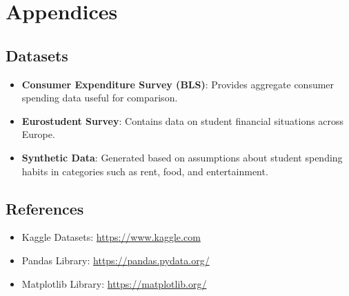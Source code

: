\documentclass{article}
\begin{document}
\section{Appendices}
\subsection{Datasets}
\begin{itemize}
    \item \textbf{Consumer Expenditure Survey (BLS)}: Provides aggregate consumer spending data useful for comparison.
    \item \textbf{Eurostudent Survey}: Contains data on student financial situations across Europe.
    \item \textbf{Synthetic Data}: Generated based on assumptions about student spending habits in categories such as rent, food, and entertainment.
\end{itemize}

\subsection{References}
\begin{itemize}
    \item Kaggle Datasets: \url{https://www.kaggle.com}
    \item Pandas Library: \url{https://pandas.pydata.org/}
    \item Matplotlib Library: \url{https://matplotlib.org/}
\end{itemize}
\end{document}
